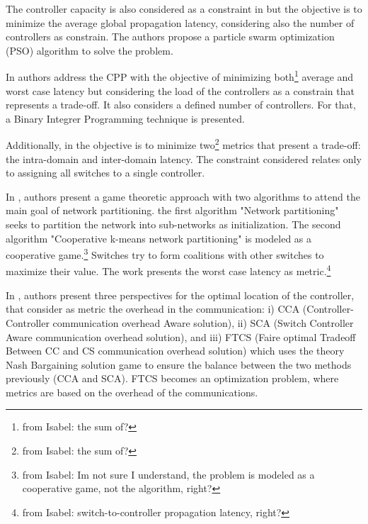 \documentclass{IEEEtran}
\newcommand\fia[1]{{\color{red}\footnote{\color{red}from Isabel: #1}}} %
\newcommand\mia[1]{{\color{red}#1}}%
\newcommand\delia[1]{{\tiny{\color{red}#1}}} %
\begin{document}
The controller capacity is also considered as a constraint in \cite{GaWa15} but the objective is to minimize the average global propagation latency, considering also the number of controllers as constrain. The authors propose a particle swarm optimization (PSO) algorithm to solve the problem. %

In \cite{HuLu16} authors address the CPP with the objective of minimizing both\fia{the sum of?} average and worst case latency but considering the load of the controllers as a constrain that represents a trade-off. It also considers a defined number of controllers. For that, a Binary Integrer Programming technique is presented. 

Additionally, in \cite{AlAy17} the objective is to minimize two\fia{the sum of?} metrics that present a trade-off: the intra-domain and inter-domain latency. The constraint considered relates only to assigning all switches to a single controller. %

In \cite{KiRe18}, authors present a game theoretic approach with two algorithms to attend the main goal of network partitioning. the first algorithm "Network partitioning" seeks to partition the network into sub-networks as initialization. The second algorithm "Cooperative k-means network partitioning" is modeled as a cooperative game.\fia{Im not sure I understand, the problem is modeled as a cooperative game, not the algorithm, right?} Switches try to form coalitions with other switches to maximize their value. The work presents the worst case \mia{latency} as metric.\fia{switch-to-controller propagation latency, right?}

In \cite{KsBa16}, authors present three perspectives for the optimal location of the controller, that consider as metric the overhead in the communication: i) CCA (Controller-Controller communication overhead Aware solution), ii) SCA (Switch Controller Aware communication overhead solution), and iii) FTCS (Faire optimal Tradeoff Between CC and CS communication overhead solution) which uses the \delia{theory} Nash Bargaining \mia{solution} \delia{game} to ensure the balance between the two methods previously (CCA and SCA). FTCS becomes an optimization problem, where metrics are based on the overhead of the communications. %
\end{document}
